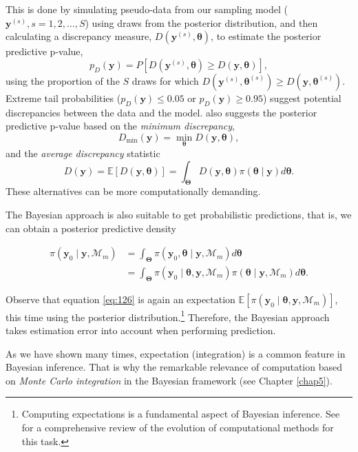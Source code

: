 This is done by simulating pseudo-data from our sampling model (\( \mathbf{y}^{(s)}, s=1,2,\dots,S \)) using draws from the posterior distribution, and then calculating a discrepancy measure, \( D(\mathbf{y}^{(s)},\bm{\theta}) \), to estimate the posterior predictive p-value,
\[
p_D(\mathbf{y}) = P[D(\mathbf{y}^{(s)},\bm{\theta}) \geq D(\mathbf{y},\bm{\theta})],
\]
using the proportion of the \( S \) draws for which \( D(\mathbf{y}^{(s)},\bm{\theta}^{(s)}) \geq D(\mathbf{y},\bm{\theta}^{(s)}) \). Extreme tail probabilities (\( p_D(\mathbf{y}) \leq 0.05 \) or \( p_D(\mathbf{y}) \geq 0.95 \)) suggest potential discrepancies between the data and the model. \cite{gelman1996posterior} also suggests the posterior predictive p-value based on the \textit{minimum discrepancy}, 
\[
D_{\min}(\mathbf{y}) = \min_{\bm{\theta}} D(\mathbf{y}, \bm{\theta}),
\]
and the \textit{average discrepancy} statistic 
\[
D(\mathbf{y}) = \mathbb{E}[D(\mathbf{y}, \bm{\theta})] = \int_{\mathbf{\Theta}} D(\mathbf{y}, \bm{\theta}) \pi(\bm{\theta} \mid \mathbf{y}) d\bm{\theta}.
\]
These alternatives can be more computationally demanding.

The Bayesian approach is also suitable to get probabilistic predictions, that is, we can obtain a posterior predictive density 

\begin{align}
	\pi(\mathbf{y}_0\mid \mathbf{y},\mathcal{M}_m) & =\int_{\mathbf{\Theta}}\pi(\mathbf{y}_0,\bm{\theta}\mid \mathbf{y},\mathcal{M}_m)d\bm{\theta}\nonumber\\
	&=\int_{\mathbf{\Theta}}\pi(\mathbf{y}_0\mid \bm{\theta},\mathbf{y},\mathcal{M}_m)\pi(\bm{\theta}\mid \mathbf{y},\mathcal{M}_m)d\bm{\theta}.
	\label{eq:126}
\end{align}

Observe that equation \ref{eq:126} is again an expectation \( \mathbb{E}[\pi(\mathbf{y}_0 \mid \bm{\theta}, \mathbf{y}, \mathcal{M}_m)] \), this time using the posterior distribution.\footnote{Computing expectations is a fundamental aspect of Bayesian inference. See \cite{martin2024computing} for a comprehensive review of the evolution of computational methods for this task.} Therefore, the Bayesian approach takes estimation error into account when performing prediction.

As we have shown many times, expectation (integration) is a common feature in Bayesian inference. That is why the remarkable relevance of computation based on \textit{Monte Carlo integration} in the Bayesian framework (see Chapter \ref{chap5}).

